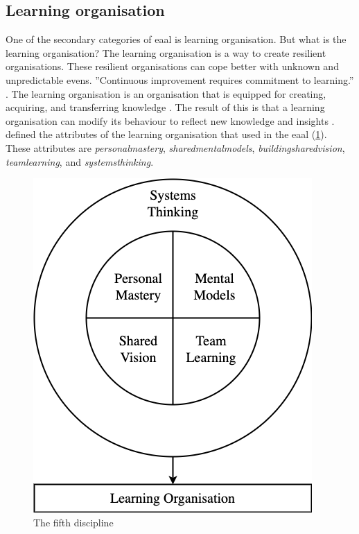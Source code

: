 \subsection{Learning organisation}
\label{sub:learningorganisation}
One of the secondary categories of \acrlong{eaal} is learning organisation. But what is the learning organisation? The learning organisation is a way to create resilient organisations. These resilient organisations can cope better with unknown and unpredictable evens. ''Continuous improvement requires commitment to learning.'' \parencite{Garvin1993}. The learning organisation is an organisation that is equipped for creating, acquiring, and transferring knowledge \parencite{Garvin1993}. The result of this is that a learning organisation can modify its behaviour to reflect new knowledge and insights \parencite{Garvin1993}. \textcite{Senge1994} defined the \glspl{attribute} of the learning organisation that \textcite{Botjes2021} used in the \acrlong{eaal} (\cref{fig:fithdiscipline}). These attributes are \textit{\gls{personalmastery}}, \textit{\glspl{sharedmentalmodel}}, \textit{\gls{buildingsharedvision}}, \textit{\gls{teamlearning}}, and \textit{\gls{systemsthinking}}.
\begin{figure}[H]
	\centering
	\includegraphics[width=0.4\linewidth]{images/fithdiscipline}
	\caption[The fifth discipline]{The fifth discipline}
	\label{fig:fithdiscipline}
\end{figure}


